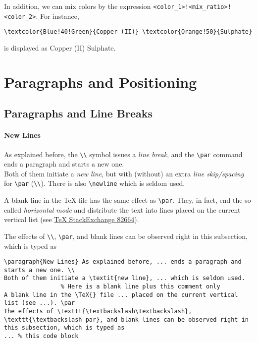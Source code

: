 In addition, we can mix colors by the expression \texttt{<color\_1>!<mix\_ratio>!\allowbreak <color\_2>}. For instance,
\begin{lstlisting}
\textcolor{Blue!40!Green}{Copper (II)} \textcolor{Orange!50}{Sulphate}
\end{lstlisting}
is displayed as \textcolor{Blue!40!Green}{Copper (II)} \textcolor{Orange!50}{Sulphate}.

\section{Paragraphs and Positioning}

\subsection{Paragraphs and Line Breaks}

\paragraph{New Lines}
As explained before, the \texttt{\textbackslash\textbackslash} symbol issues a \textit{line break}, and the \texttt{\textbackslash par} command ends a paragraph and starts a new one. \\
Both of them initiate a \textit{new line}, but with (without) an extra \textit{line skip/spacing} for \texttt{\textbackslash par} (\texttt{\textbackslash\textbackslash}). There is also \texttt{\textbackslash newline} which is seldom used.
    
A blank line in the \TeX{} file has the same effect as \texttt{\textbackslash par}. They, in fact, end the so-called \textit{horizontal mode} and distribute the text into lines placed on the current vertical list (see \href{https://tex.stackexchange.com/questions/82664/when-to-use-par-and-when-newline-or-blank-lines}{\TeX{} StackExchange 82664}). \par 
The effects of \texttt{\textbackslash\textbackslash}, \texttt{\textbackslash par}, and blank lines can be observed right in this subsection, which is typed as
\begin{lstlisting}
\paragraph{New Lines} As explained before, ... ends a paragraph and starts a new one. \\
Both of them initiate a \textit{new line}, ... which is seldom used.
                % Here is a blank line plus this comment only
A blank line in the \TeX{} file ... placed on the current vertical list (see ...). \par
The effects of \texttt{\textbackslash\textbackslash}, \texttt{\textbackslash par}, and blank lines can be observed right in this subsection, which is typed as
... % this code block
\end{lstlisting}


